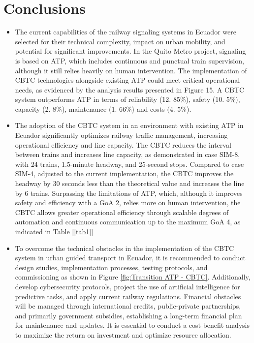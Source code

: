 \documentclass[conference]{IEEEtran}
\begin{document}

\section{Conclusions}
\begin{itemize}
\item The current capabilities of the railway signaling systems in Ecuador were selected for their technical complexity, impact on urban mobility, and potential for significant improvements. In the Quito Metro project, signaling is based on ATP, which includes continuous and punctual train supervision, although it still relies heavily on human intervention. The implementation of CBTC technologies alongside existing ATP could meet critical operational needs, as evidenced by the analysis results presented in Figure 15. A CBTC system outperforms ATP in terms of reliability (12. 85\%), safety (10. 5\%), capacity (2. 8\%), maintenance (1. 66\%) and costs (4. 5\%).

\item The adoption of the CBTC system in an environment with existing ATP in Ecuador significantly optimizes railway traffic management, increasing operational efficiency and line capacity. The CBTC reduces the interval between trains and increases line capacity, as demonstrated in case SIM-8, with 24 trains, 1.5-minute headway, and 25-second stops. Compared to case SIM-4, adjusted to the current implementation, the CBTC improves the headway by 30 seconds less than the theoretical value and increases the line by 6 trains. Surpassing the limitations of ATP, which, although it improves safety and efficiency with a GoA 2, relies more on human intervention, the CBTC allows greater operational efficiency through scalable degrees of automation and continuous communication up to the maximum GoA 4, as indicated in Table  [\ref{tab1}]

\item To overcome the technical obstacles in the implementation of the CBTC system in urban guided transport in Ecuador, it is recommended to conduct design studies, implementation processes, testing protocols, and commissioning as shown in Figure \ref{fig:Transition ATP - CBTC}. Additionally, develop cybersecurity protocols, project the use of artificial intelligence for predictive tasks, and apply current railway regulations. Financial obstacles will be managed through international credits, public-private partnerships, and primarily government subsidies, establishing a long-term financial plan for maintenance and updates. It is essential to conduct a cost-benefit analysis to maximize the return on investment and optimize resource allocation.
\end{itemize}
\end{document}

